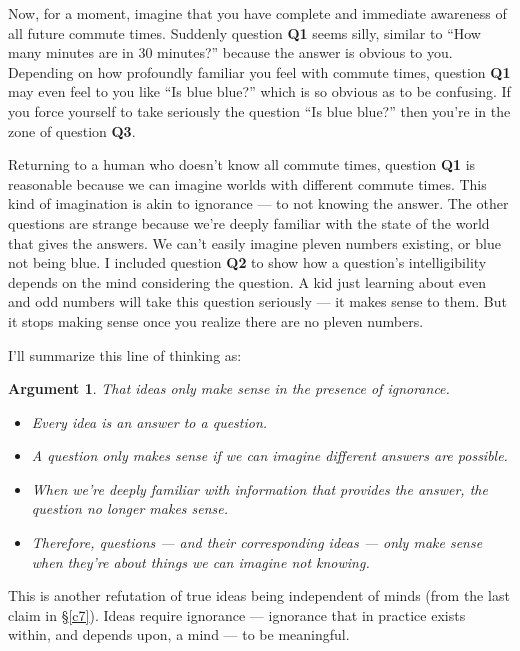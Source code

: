 \documentclass[11pt, oneside]{article}
\theoremstyle{argtstyle}
\newtheorem*{argt}{Argument}
\begin{document}
Now, for a moment, imagine that you have complete and immediate awareness of all
future commute times. Suddenly question {\bf Q1} seems silly, similar to
``How many minutes are in 30 minutes?''
because the answer is obvious to you.
Depending on how profoundly
familiar you feel with commute times, question {\bf Q1} may even feel to you
like ``Is blue blue?'' which is so obvious as to be confusing. If you force
yourself to take seriously the question ``Is blue blue?'' then you're in the
zone of question {\bf Q3}.

Returning to a human who doesn't know all commute times,
question {\bf Q1} is
reasonable because we can imagine worlds with different commute
times. This kind of imagination is akin to ignorance --- to not knowing the
answer.
The other questions are strange because we're deeply familiar with the state of
the world that gives the answers. We can't easily imagine pleven numbers
existing, or blue not being blue.
I included question {\bf Q2} to show how a question's intelligibility
depends on the mind
considering the question. A kid just learning about even and odd numbers will
take this question seriously --- it makes sense to them. But it stops making
sense once you realize there are no pleven numbers.

I'll summarize this line of thinking as:
\begin{argt} That ideas only make sense in the presence of ignorance.
    \label{a3}
    \normalfont
    \begin{itemize}
        \item Every idea is an answer to a question.
        \item A question only makes sense if we can imagine different
            answers are possible.
        \item When we're deeply familiar with information that
            provides the answer, the question no longer makes sense.
        \item Therefore, questions --- and their corresponding ideas --- only
            make sense when they're about things we can imagine not knowing.
    \end{itemize}
\end{argt}
This is another refutation of true ideas being independent of minds (from
the last claim in \S\ref{c7}).
Ideas require ignorance --- ignorance that in practice
exists within, and depends upon, a mind ---
to be meaningful.

\end{document}
